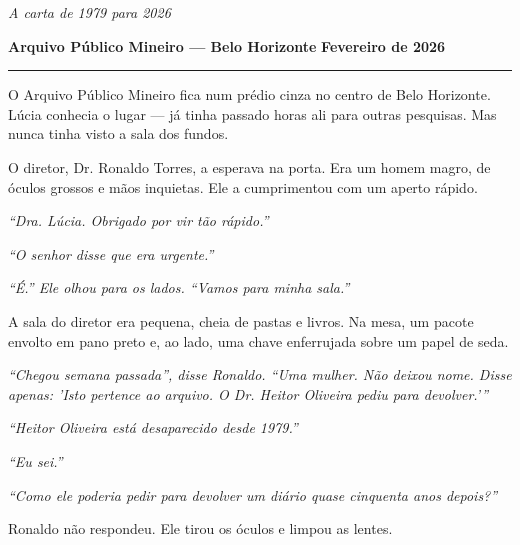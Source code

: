 
\noindent \textit{A carta de 1979 para 2026}

\noindent \textbf{Arquivo Público Mineiro --- Belo Horizonte}
\textbf{Fevereiro de 2026}

\vspace{0.5em}\noindent\rule{\textwidth}{0.5pt}\vspace{0.5em}

\noindent O Arquivo Público Mineiro fica num prédio cinza no centro de Belo Horizonte. Lúcia conhecia o lugar --- já tinha passado horas ali para outras pesquisas. Mas nunca tinha visto a sala dos fundos.

\noindent O diretor, Dr. Ronaldo Torres, a esperava na porta. Era um homem magro, de óculos grossos e mãos inquietas. Ele a cumprimentou com um aperto rápido.

\noindent \textit{\textquotedblleft{}Dra. Lúcia. Obrigado por vir tão rápido.\textquotedblright{}}

\noindent \textit{\textquotedblleft{}O senhor disse que era urgente.\textquotedblright{}}

\noindent \textit{\textquotedblleft{}É.\textquotedblright{}\textit{ Ele olhou para os lados. }\textquotedblleft{}Vamos para minha sala.\textquotedblright{}}

\noindent A sala do diretor era pequena, cheia de pastas e livros. Na mesa, um pacote envolto em pano preto e, ao lado, uma chave enferrujada sobre um papel de seda.

\noindent \textit{\textquotedblleft{}Chegou semana passada\textquotedblright{}\textit{, disse Ronaldo. }\textquotedblleft{}Uma mulher. Não deixou nome. Disse apenas: 'Isto pertence ao arquivo. O Dr. Heitor Oliveira pediu para devolver.'\textquotedblright{}}

\noindent \textit{\textquotedblleft{}Heitor Oliveira está desaparecido desde 1979.\textquotedblright{}}

\noindent \textit{\textquotedblleft{}Eu sei.\textquotedblright{}}

\noindent \textit{\textquotedblleft{}Como ele poderia pedir para devolver um diário quase cinquenta anos depois?\textquotedblright{}}

\noindent Ronaldo não respondeu. Ele tirou os óculos e limpou as lentes.

